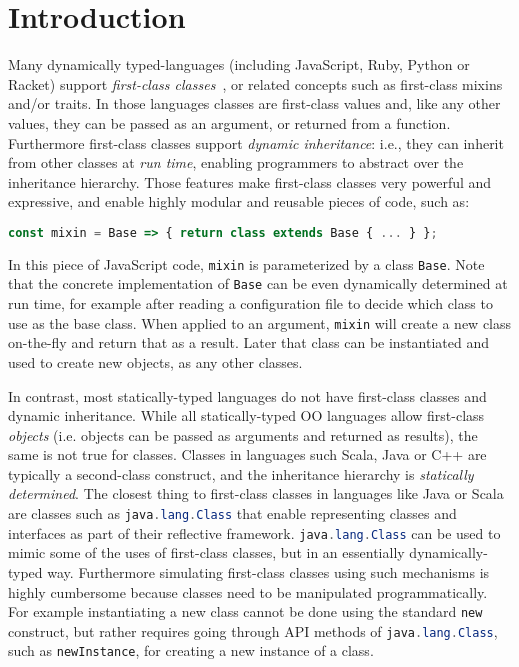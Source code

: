 \section{Introduction}
\label{sec:intro}

Many dynamically typed-languages (including JavaScript, Ruby, Python
or Racket) support \emph{first-class classes}~\citep{DBLP:conf/aplas/FlattFF06}, or related concepts
such as first-class mixins and/or traits. In those languages classes
are first-class values and, like any other values, they can be
passed as an argument, or returned from a function. Furthermore
first-class classes support \emph{dynamic inheritance}: i.e., they
can inherit from other classes at \emph{run time}, enabling
programmers to abstract over the inheritance hierarchy. 
Those features make first-class classes very powerful and expressive,
and enable highly modular and reusable pieces of code, such as:
\begin{lstlisting}[language=JavaScript]
const mixin = Base => { return class extends Base { ... } };
\end{lstlisting}
In this piece of JavaScript code, \lstinline{mixin} is
parameterized by a class \lstinline{Base}. Note that the concrete
implementation of \lstinline{Base} can be 
even dynamically determined at run time, for example
after reading a configuration file to decide which 
class to use as the base class.  When applied to an argument, 
\lstinline{mixin} will create a new class on-the-fly and return that
as a result. Later that class can be instantiated and used to create 
new objects, as any other classes.

In contrast, most statically-typed
languages do not have first-class classes and dynamic
inheritance. While all statically-typed OO languages allow first-class
\emph{objects} (i.e. objects can be passed as arguments and returned
as results), the same is not true for classes. Classes in languages such
Scala, Java or C++ are typically a second-class construct, and the
inheritance hierarchy is \emph{statically determined}. The closest thing
to first-class classes in 
languages like Java or Scala are classes such as 
\lstinline[language=java]{java.lang.Class} that enable representing classes and
interfaces as part of their reflective framework. \lstinline[language=java]{java.lang.Class} can be used to
mimic some of the uses of first-class classes, but in an essentially
dynamically-typed way. Furthermore simulating first-class classes
using such mechanisms is highly cumbersome because classes need to be
manipulated programmatically. For example instantiating a new class
cannot be done using the standard \lstinline{new} construct, but
rather requires going through API methods of
\lstinline[language=java]{java.lang.Class}, such as \lstinline{newInstance}, for
creating a new instance of a class.

